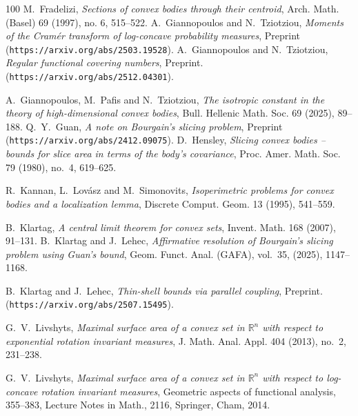 \documentclass[11pt,leqno]{article}
\theoremstyle{remark}
\numberwithin{equation}{section}
\begin{document}
\begin{thebibliography}{100}
 {\rm M.\ Fradelizi}, \textit{Sections of convex bodies through their centroid},
Arch. Math. (Basel) {69} (1997), no. 6, 515--522.
 \textrm{A.\ Giannopoulos and N.\ Tziotziou}, \textit{Moments of the Cram\'{e}r
transform of log-concave probability measures}, Preprint ({\tt https://arxiv.org/abs/2503.19528}).
 \textrm{A.\ Giannopoulos and N.\ Tziotziou}, \textit{Regular functional covering numbers}, 
Preprint. \\ ({\tt https://arxiv.org/abs/2512.04301}).

 \textrm{A.\ Giannopoulos, M.\ Pafis and N.\ Tziotziou}, 
\textit{The isotropic constant in the theory of high-dimensional convex bodies}, Bull. Hellenic Math. Soc. 69 (2025), 89--188.
 \textrm{Q.~Y.~Guan}, \textit{A note on Bourgain's slicing problem},
Preprint ({\tt https://arxiv.org/abs/2412.09075}).
 \textrm{D.~Hensley}, \textit{Slicing convex bodies -- bounds for slice area in terms of the body's covariance}, 
Proc. Amer. Math. Soc. 79 (1980), no.~4, 619--625.

 \textrm{R.\ Kannan, L.\ Lov\'{a}sz and M.\ Simonovits},
\textit{Isoperimetric problems for convex bodies and a localization lemma}, Discrete Comput. Geom. {13} (1995), 541--559.

 \textrm{B.\ Klartag}, \textit{A central limit theorem for convex sets}, Invent. Math. 168 (2007), 91--131.
 \textrm{B.~Klartag and J.~Lehec}, \textit{Affirmative resolution of Bourgain's slicing problem using
Guan's bound}, Geom. Funct. Anal. (GAFA), vol.~35, (2025), 1147--1168.

 B.~Klartag and J.~Lehec, \textit{Thin-shell bounds via parallel coupling},
Preprint.\\ ({\tt https://arxiv.org/abs/2507.15495}).

 \textrm{G.~V.~Livshyts}, \textit{Maximal surface area of a convex set in
$\mathbb{R}^n$ with respect to exponential rotation invariant measures}, J. Math. Anal. Appl. 404 (2013), no.~2, 231--238.

 \textrm{G.~V.~Livshyts}, \textit{Maximal surface area of a convex set in $\mathbb{R}^n$ with respect 
to log-concave rotation invariant measures}, Geometric aspects of functional analysis, 355--383, Lecture Notes in Math., 2116, Springer, Cham, 2014. 


\end{thebibliography}
\end{document}

